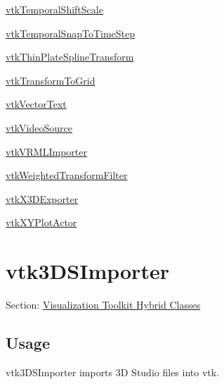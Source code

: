 \begin{DoxyItemize}
\item \hyperlink{vtkhybrid_vtktemporalshiftscale}{vtk\-Temporal\-Shift\-Scale}  
\item \hyperlink{vtkhybrid_vtktemporalsnaptotimestep}{vtk\-Temporal\-Snap\-To\-Time\-Step}  
\item \hyperlink{vtkhybrid_vtkthinplatesplinetransform}{vtk\-Thin\-Plate\-Spline\-Transform}  
\item \hyperlink{vtkhybrid_vtktransformtogrid}{vtk\-Transform\-To\-Grid}  
\item \hyperlink{vtkhybrid_vtkvectortext}{vtk\-Vector\-Text}  
\item \hyperlink{vtkhybrid_vtkvideosource}{vtk\-Video\-Source}  
\item \hyperlink{vtkhybrid_vtkvrmlimporter}{vtk\-V\-R\-M\-L\-Importer}  
\item \hyperlink{vtkhybrid_vtkweightedtransformfilter}{vtk\-Weighted\-Transform\-Filter}  
\item \hyperlink{vtkhybrid_vtkx3dexporter}{vtk\-X3\-D\-Exporter}  
\item \hyperlink{vtkhybrid_vtkxyplotactor}{vtk\-X\-Y\-Plot\-Actor}  
\end{DoxyItemize}\hypertarget{vtkhybrid_vtk3dsimporter}{}\section{vtk3\-D\-S\-Importer}\label{vtkhybrid_vtk3dsimporter}
Section\-: \hyperlink{sec_vtkhybrid}{Visualization Toolkit Hybrid Classes} \hypertarget{vtkwidgets_vtkxyplotwidget_Usage}{}\subsection{Usage}\label{vtkwidgets_vtkxyplotwidget_Usage}
vtk3\-D\-S\-Importer imports 3\-D Studio files into vtk.

